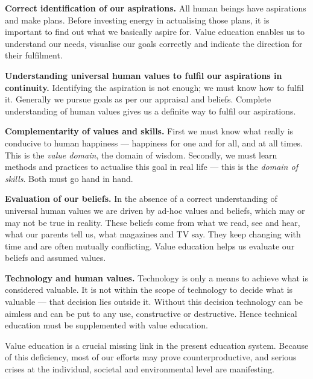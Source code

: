 \ans
\begin{apts}
\item \textbf{Correct identification of our aspirations.} All human beings
      have aspirations and make plans. Before investing energy in actualising
      those plans, it is important to find out what we basically aspire for.
      Value education enables us to understand our needs, visualise our goals
      correctly and indicate the direction for their fulfilment.
\item \textbf{Understanding universal human values to fulfil our aspirations
      in continuity.} Identifying the aspiration is not enough; we must know
      how to fulfil it. Generally we pursue goals as per our appraisal and
      beliefs. Complete understanding of human values gives us a definite way
      to fulfil our aspirations.
\item \textbf{Complementarity of values and skills.} First we must know what
      really is conducive to human happiness --- happiness for one and for
      all, and at all times. This is the \emph{value domain}, the domain of
      wisdom. Secondly, we must learn methods and practices to actualise this
      goal in real life --- this is the \emph{domain of skills}. Both must go
      hand in hand.
\item \textbf{Evaluation of our beliefs.} In the absence of a correct
      understanding of universal human values we are driven by ad-hoc values
      and beliefs, which may or may not be true in reality. These beliefs come
      from what we read, see and hear, what our parents tell us, what
      magazines and TV say. They keep changing with time and are often
      mutually conflicting. Value education helps us evaluate our beliefs and
      assumed values.
\item \textbf{Technology and human values.} Technology is only a means to
      achieve what is considered valuable. It is not within the scope of
      technology to decide what is valuable --- that decision lies outside it.
      Without this decision technology can be aimless and can be put to any
      use, constructive or destructive. Hence technical education must be
      supplemented with value education.
\end{apts}

Value education is a crucial missing link in the present education system.
Because of this deficiency, most of our efforts may prove counterproductive,
and serious crises at the individual, societal and environmental level are
manifesting.

